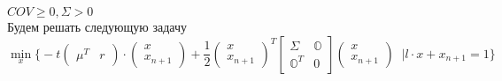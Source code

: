 \documentclass[12pt]{article}
\theoremstyle{definition}
\theoremstyle{remark}
\begin{document}
$COV\geq 0, \Sigma>0$\\
Будем решать следующую задачу
\begin{equation}
  \min\limits_{x}\bigg\{ -t\begin{pmatrix} \mu^T&r \end{pmatrix}\cdot \begin{pmatrix} x\\ x_{n+1}\end{pmatrix}
  +\frac{1}{2} \begin{pmatrix} x\\ x_{n+1} \end{pmatrix}^T \begin{bmatrix} \Sigma&\mathbb{O}\\\mathbb{O}^T&0 \end{bmatrix}
    \begin{pmatrix} x\\ x_{n+1} \end{pmatrix}\;\;\bigg| l\cdot x+x_{n+1}=1 \bigg\}
\end{equation}
\end{document}

